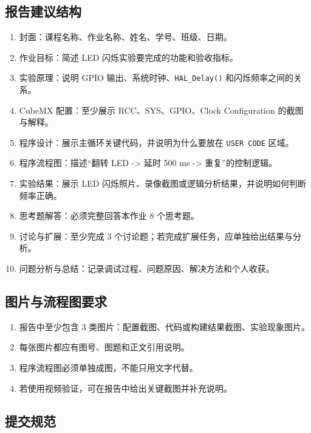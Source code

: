 \documentclass[
  chinese,
  UTF8,
  oneside,
  openany]{ctexbook}
\providecommand{\tightlist}{%
  \setlength{\itemsep}{0pt}\setlength{\parskip}{0pt}}
\begin{document}
\subsection{报告建议结构}\label{ux62a5ux544aux5efaux8baeux7ed3ux6784-1}

\begin{enumerate}
\def\labelenumi{\arabic{enumi}.}
\tightlist
\item
  封面：课程名称、作业名称、姓名、学号、班级、日期。
\item
  作业目标：简述 LED 闪烁实验要完成的功能和验收指标。
\item
  实验原理：说明 GPIO 输出、系统时钟、\texttt{HAL\_Delay()}
  和闪烁频率之间的关系。
\item
  CubeMX 配置：至少展示 RCC、SYS、GPIO、Clock Configuration
  的截图与解释。
\item
  程序设计：展示主循环关键代码，并说明为什么要放在 \texttt{USER\ CODE}
  区域。
\item
  程序流程图：描述``翻转 LED -\textgreater{} 延时 500 ms -\textgreater{}
  重复''的控制逻辑。
\item
  实验结果：展示 LED
  闪烁照片、录像截图或逻辑分析结果，并说明如何判断频率正确。
\item
  思考题解答：必须完整回答本作业 8 个思考题。
\item
  讨论与扩展：至少完成 3
  个讨论题；若完成扩展任务，应单独给出结果与分析。
\item
  问题分析与总结：记录调试过程、问题原因、解决方法和个人收获。
\end{enumerate}

\subsection{图片与流程图要求}\label{ux56feux7247ux4e0eux6d41ux7a0bux56feux8981ux6c42-1}

\begin{enumerate}
\def\labelenumi{\arabic{enumi}.}
\tightlist
\item
  报告中至少包含 3 类图片：配置截图、代码或构建结果截图、实验现象图片。
\item
  每张图片都应有图号、图题和正文引用说明。
\item
  程序流程图必须单独成图，不能只用文字代替。
\item
  若使用视频验证，可在报告中给出关键截图并补充说明。
\end{enumerate}

\subsection{提交规范}\label{ux63d0ux4ea4ux89c4ux8303-1}
\end{document}
